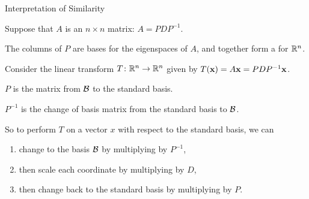 \documentclass[xcolor=dvipsnames,aspectratio=169,t]{beamer}
\begin{document}
\begin{frame}{Interpretation of Similarity}
  \bigskip
  
  Suppose that $A$ is an $n\times n$  matrix: $A=PDP^{-1}$.
  \smallskip
  
  The columns of $P$ are bases for the eigenspaces of $A$, and together form a   for $\mathbb{R}^n$.
  \medskip
  
  Consider the linear transform $T\colon\mathbb{R}^n\to\mathbb{R}^n$ given by $T(\mathbf{x})=A\mathbf{x} = PDP^{-1}\mathbf{x}$.
  \bigskip
  
  \pause
  $P$ is the  matrix from $\mathcal{B}$ to the standard basis.
  \smallskip
  
  $P^{-1}$ is the change of basis matrix from the standard basis to $\mathcal{B}$.
  \bigskip
  
  So to perform $T$ on a vector $x$ with respect to the standard basis, we can 
  \begin{enumerate}
    \item change to the basis $\mathcal{B}$ by multiplying by $P^{-1}$,
    \item then scale each coordinate by multiplying by $D$,
    \item then change back to the standard basis by multiplying by $P$.
  \end{enumerate}
\end{frame}
\end{document}
